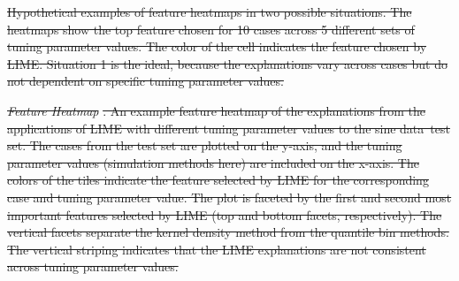 \documentclass[AMS,STIX2COL]{WileyNJD-v2}\usepackage[]{graphicx}\usepackage[]{color}
\newenvironment{knitrout}{}{} %
\newcommand{\data}{sine data}
\providecommand{\DIFdel}[1]{{\protect\color{red}\sout{#1}}}                      %
\providecommand{\DIFdelbegin}{} %
\providecommand{\DIFdelFL}[1]{\DIFdel{#1}} %
\newcommand{\DIFscaledelfig}{0.5}
\newlength{\DIFdelgraphicswidth} %
\newlength{\DIFdelgraphicsheight} %
\newcommand{\DIFdelincludegraphics}[2][]{%
\sbox{\DIFdelgraphicsbox}{\DIFOincludegraphics[#1]{#2}}%
\settoboxwidth{\DIFdelgraphicswidth}{\DIFdelgraphicsbox} %
\settoboxtotalheight{\DIFdelgraphicsheight}{\DIFdelgraphicsbox} %
\scalebox{\DIFscaledelfig}{%
\parbox[b]{\DIFdelgraphicswidth}{\usebox{\DIFdelgraphicsbox}\\[-\baselineskip] \rule{\DIFdelgraphicswidth}{0em}}\llap{\resizebox{\DIFdelgraphicswidth}{\DIFdelgraphicsheight}{%
\setlength{\unitlength}{\DIFdelgraphicswidth}%
\begin{picture}(1,1)%
\thicklines\linethickness{2pt} %
{\color[rgb]{1,0,0}\put(0,0){\framebox(1,1){}}}%
{\color[rgb]{1,0,0}\put(0,0){\line( 1,1){1}}}%
{\color[rgb]{1,0,0}\put(0,1){\line(1,-1){1}}}%
\end{picture}%
}\hspace*{3pt}}} %
} %
\DeclareRobustCommand{\DIFdelbegin}{\DIFOdelbegin \let\includegraphics\DIFdelincludegraphics} %
\begin{document}
\DIFdelbegin %



{%
\DIFdelFL{Hypothetical examples of feature heatmaps in two possible situations. The heatmaps show the top feature chosen for 10 cases across 5 different sets of tuning parameter values. The color of the cell indicates the feature chosen by LIME. Situation 1 is the ideal, because the explanations vary across cases but do not dependent on specific tuning parameter values.}}





{%
\emph{\DIFdelFL{Feature Heatmap}}%
\DIFdelFL{. An example feature heatmap of the explanations from the applications of LIME with different tuning parameter values to the \data \ test set. The cases from the test set are plotted on the y-axis, and the tuning parameter values (simulation methods here) are included on the x-axis. The colors of the tiles indicate the feature selected by LIME for the corresponding case and tuning parameter value. The plot is faceted by the first and second most important features selected by LIME (top and bottom facets, respectively). The vertical facets separate the  kernel density method from the quantile bin methods. The vertical striping indicates that the LIME explanations are not consistent across tuning parameter values.}}
\end{document}
